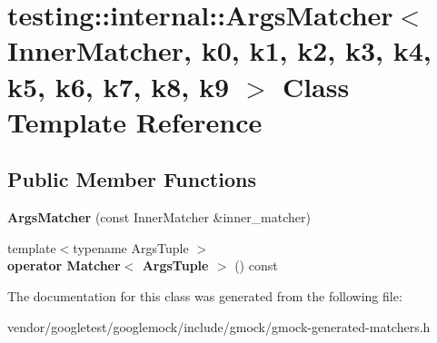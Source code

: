 \hypertarget{classtesting_1_1internal_1_1_args_matcher}{}\section{testing\+:\+:internal\+:\+:Args\+Matcher$<$ Inner\+Matcher, k0, k1, k2, k3, k4, k5, k6, k7, k8, k9 $>$ Class Template Reference}
\label{classtesting_1_1internal_1_1_args_matcher}
\subsection*{Public Member Functions}
\begin{DoxyCompactItemize}
\item 
\mbox{\label{classtesting_1_1internal_1_1_args_matcher_a2879d7455f2da2a5a2f2b6759dbc0561}} 
{\bfseries Args\+Matcher} (const Inner\+Matcher \&inner\+\_\+matcher)
\item 
\mbox{\label{classtesting_1_1internal_1_1_args_matcher_ad55698b0de384a9d8875cef5b172cb4a}} 
{\footnotesize template$<$typename Args\+Tuple $>$ }\\{\bfseries operator Matcher$<$ Args\+Tuple $>$} () const
\end{DoxyCompactItemize}


The documentation for this class was generated from the following file\+:\begin{DoxyCompactItemize}
\item 
vendor/googletest/googlemock/include/gmock/gmock-\/generated-\/matchers.\+h\end{DoxyCompactItemize}
